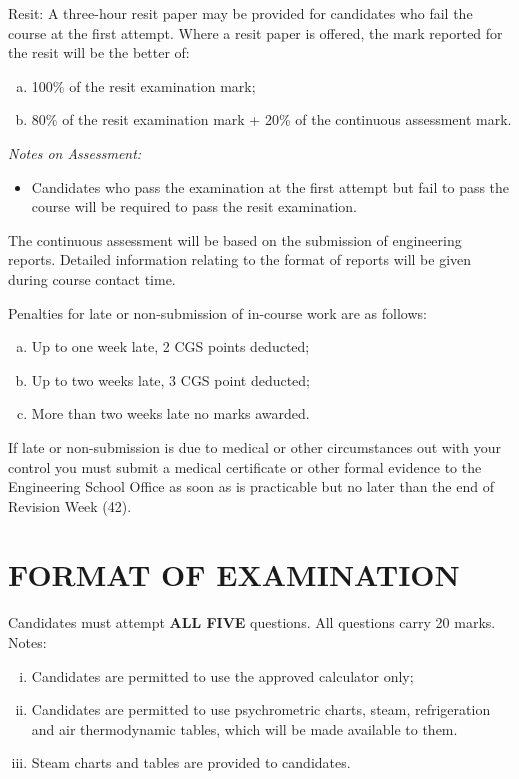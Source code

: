 \documentclass[12pts,a4paper,amsmath,amssymb,floatfix]{article}%
\begin{document}
Resit: A three-hour resit paper may be provided for candidates who fail the course at the first attempt. Where a resit paper is offered, the mark reported for the resit will be the better of:
\begin{enumerate}[(a)]
  \item 100$\%$ of the resit examination mark;
  \item 80$\%$ of the resit examination mark + 20$\%$ of the continuous assessment mark.
\end{enumerate}
\medskip

{\it Notes on Assessment:
\begin{itemize}
\item Candidates who pass the examination at the first attempt but fail to pass the course will be required to pass the resit examination.
\end{itemize}}

\medskip

The continuous assessment will be based on the submission of engineering reports. Detailed information relating to the format of reports will be given during course contact time.
\medskip

Penalties for late or non-submission of in-course work are as follows:
\begin{enumerate}[(a)]
\item Up to one week late, 2 CGS points deducted;
\item Up to two weeks late, 3 CGS point deducted;
\item More than two weeks late no marks awarded.
\end{enumerate}
If late or non-submission is due to medical or other circumstances out with your control you must submit a medical certificate or other formal evidence to the Engineering School Office as soon as is practicable but no later than the end of Revision Week (42).


\section{FORMAT OF EXAMINATION}
Candidates must attempt {\bf ALL FIVE} questions. All questions carry 20 marks. Notes:
\begin{enumerate}[(i)]
\item Candidates are permitted to use the approved calculator only;
\item Candidates are permitted to use psychrometric charts, steam, refrigeration and air thermodynamic tables, which will be made available to them.
\item Steam charts and tables are provided to candidates.
\end{enumerate}
\end{document}
